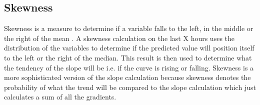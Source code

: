 \subsection{Skewness}
\label{sec:skewness}
Skewness is a measure to determine if a variable falls to the left, in the middle or the right of the mean \cite[Chapter~1.1.2]{econometrics}. A skewness calculation on the last X hours uses the distribution of the variables to determine if the predicted value will position itself to the left or the right of the median. This result is then used to determine what the tendency of the slope will be i.e. if the curve is rising or falling. Skewness is a more sophisticated version of the slope calculation because skewness denotes the probability of what the trend will be compared to the slope calculation which just calculates a sum of all the gradients.


